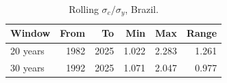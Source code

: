 \begin{table}[H]
\centering
\begin{tabular}{lrrrrr}
  \toprule
Window & From & To & Min & Max & Range \\ 
  \midrule
20 years & 1982 & 2025 & 1.022 & 2.283 & 1.261 \\ 
  30 years & 1992 & 2025 & 1.071 & 2.047 & 0.977 \\ 
   \bottomrule
\end{tabular}
\caption{Rolling $\sigma_c/\sigma_y$, Brazil.}
\label{tab:q3}
\end{table}
